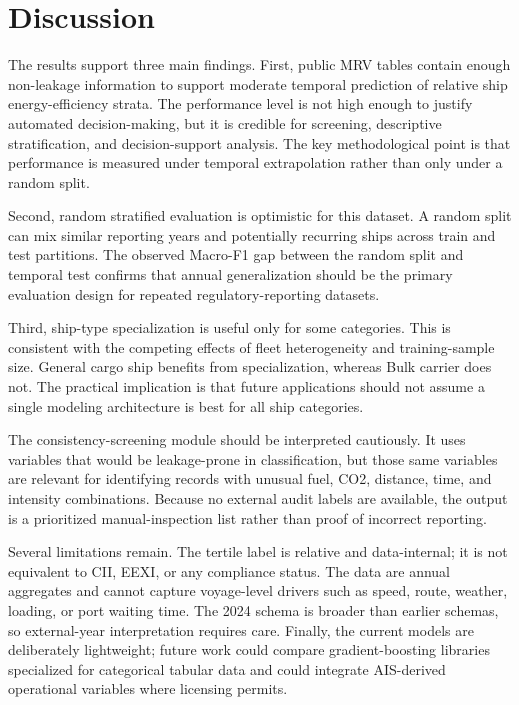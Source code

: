 \documentclass[jmse,article,submit,pdftex,oneauthor]{Definitions/mdpi}
\begin{document}
\section{Discussion}

The results support three main findings. First, public MRV tables contain enough non-leakage information to support moderate temporal prediction of relative ship energy-efficiency strata. The performance level is not high enough to justify automated decision-making, but it is credible for screening, descriptive stratification, and decision-support analysis. The key methodological point is that performance is measured under temporal extrapolation rather than only under a random split.

Second, random stratified evaluation is optimistic for this dataset. A random split can mix similar reporting years and potentially recurring ships across train and test partitions. The observed Macro-F1 gap between the random split and temporal test confirms that annual generalization should be the primary evaluation design for repeated regulatory-reporting datasets.

Third, ship-type specialization is useful only for some categories. This is consistent with the competing effects of fleet heterogeneity and training-sample size. General cargo ship benefits from specialization, whereas Bulk carrier does not. The practical implication is that future applications should not assume a single modeling architecture is best for all ship categories.

The consistency-screening module should be interpreted cautiously. It uses variables that would be leakage-prone in classification, but those same variables are relevant for identifying records with unusual fuel, CO2, distance, time, and intensity combinations. Because no external audit labels are available, the output is a prioritized manual-inspection list rather than proof of incorrect reporting.

Several limitations remain. The tertile label is relative and data-internal; it is not equivalent to CII, EEXI, or any compliance status. The data are annual aggregates and cannot capture voyage-level drivers such as speed, route, weather, loading, or port waiting time. The 2024 schema is broader than earlier schemas, so external-year interpretation requires care. Finally, the current models are deliberately lightweight; future work could compare gradient-boosting libraries specialized for categorical tabular data and could integrate AIS-derived operational variables where licensing permits.
\end{document}
